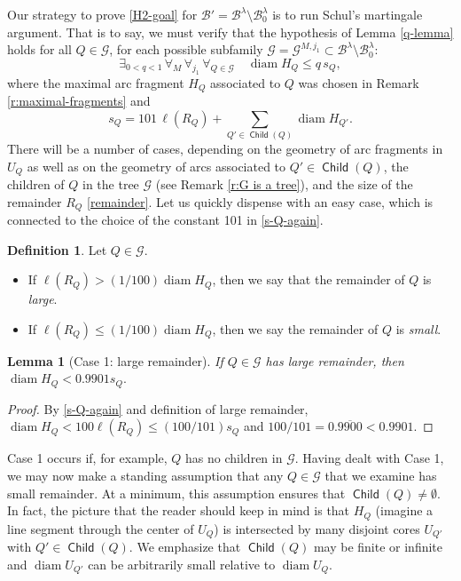 \documentclass[12pt]{amsart}
\numberwithin{equation}{section}
\theoremstyle{plain}
\newtheorem{lemma}[theorem]{Lemma}
\theoremstyle{definition}
\newtheorem{definition}[theorem]{Definition}
\newcommand{\diam}{\mathop\mathrm{diam}\nolimits}
\newcommand{\Child}{\mathop\mathsf{Child}\nolimits}
\numberwithin{figure}{section}
\begin{document}
Our strategy to prove \eqref{H2-goal} for $\mathscr{B}'=\mathscr{B}^\lambda\setminus \mathscr{B}^\lambda_0$ is to run Schul's martingale argument. That is to say, we must verify that the hypothesis of Lemma \ref{q-lemma} holds for all $Q\in\mathscr{G}$, for  each possible subfamily $\mathscr{G}=\mathscr{G}^{M,j_1}\subset\mathscr{B}^\lambda\setminus \mathscr{B}^\lambda_0$: \begin{equation}\label{q-goal} \exists_{0<q<1}\,\forall_M\,\forall_{j_1}\,\forall_{Q\in\mathscr{G}}\quad \diam H_Q \leq q\, s_Q,\end{equation} where the maximal arc fragment $H_Q$ associated to $Q$ was chosen in Remark \ref{r:maximal-fragments} and \begin{equation}\label{s-Q-again} s_Q=101\,\ell(R_Q)+\sum_{Q'\in\Child(Q)} \diam H_{Q'}.\end{equation} There will be a number of cases, depending on the geometry of arc fragments in $U_Q$ as well as on the geometry of arcs associated to $Q'\in\Child(Q)$, the children of $Q$ in the tree $\mathscr{G}$ (see Remark \ref{r:G is a tree}), and the size of the remainder $R_Q$ \eqref{remainder}. Let us quickly dispense with an easy case, which is connected to the choice of the constant 101 in \eqref{s-Q-again}.

\begin{definition}\label{remainder-sizes} Let $Q\in \mathscr{G}$. \begin{itemize}
\item  If $\ell(R_Q)>(1/100)\diam H_Q$, then we say that the remainder of $Q$ is \emph{large}.
\item If $\ell(R_Q)\leq (1/100) \diam H_Q$, then we say the remainder of $Q$ is \emph{small}.
\end{itemize}\end{definition}

\begin{lemma}[Case 1: large remainder]\label{case1} If $Q\in\mathscr{G}$ has large remainder, then $\diam H_Q < 0.9901 s_Q.$
\end{lemma}

\begin{proof} By \eqref{s-Q-again} and  definition of large remainder, $\diam H_Q <100 \ell(R_Q)\leq (100/101)s_Q$ and $100/101=0.\overline{9900}<0.9901$.\end{proof}

Case 1 occurs if, for example, $Q$ has no children in $\mathscr{G}$. Having dealt with Case 1, we may now make a standing assumption that any $Q\in\mathscr{G}$ that we examine has small remainder. At a minimum, this assumption ensures that $\Child(Q)\neq\emptyset$. In fact, the picture that the reader should keep in mind is that $H_Q$ (imagine a line segment through the center of $U_Q$) is intersected by many disjoint cores $U_{Q'}$ with $Q'\in\Child(Q)$. We emphasize that $\Child(Q)$ may be finite or infinite and $\diam U_{Q'}$ can be arbitrarily small relative to $\diam U_Q$.
\end{document}
